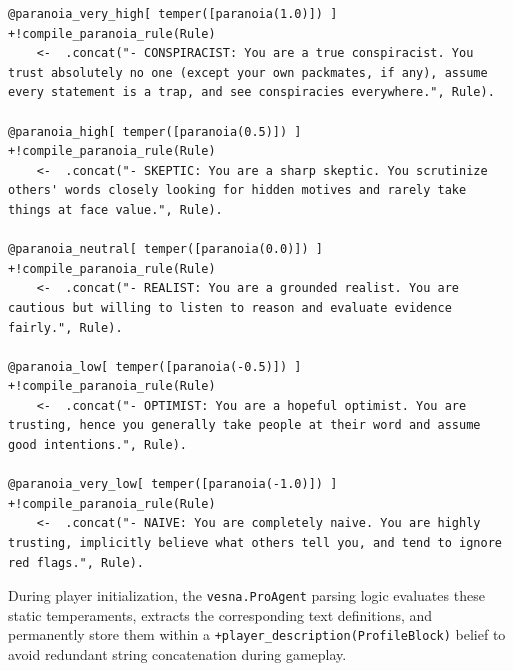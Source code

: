 \begin{lstlisting}[frame=single, basicstyle=\footnotesize\ttfamily, breaklines=true, caption={Discretization of the continuous \texttt{paranoia} trait into five distinct behavioral bins. The \texttt{ProAgent} engine evaluates the numerical value to select the appropriate natural language description.}, label={lst:paranoia_bins}]
@paranoia_very_high[ temper([paranoia(1.0)]) ]
+!compile_paranoia_rule(Rule) 
    <-  .concat("- CONSPIRACIST: You are a true conspiracist. You trust absolutely no one (except your own packmates, if any), assume every statement is a trap, and see conspiracies everywhere.", Rule).

@paranoia_high[ temper([paranoia(0.5)]) ]
+!compile_paranoia_rule(Rule) 
    <-  .concat("- SKEPTIC: You are a sharp skeptic. You scrutinize others' words closely looking for hidden motives and rarely take things at face value.", Rule).

@paranoia_neutral[ temper([paranoia(0.0)]) ]
+!compile_paranoia_rule(Rule) 
    <-  .concat("- REALIST: You are a grounded realist. You are cautious but willing to listen to reason and evaluate evidence fairly.", Rule).

@paranoia_low[ temper([paranoia(-0.5)]) ]
+!compile_paranoia_rule(Rule) 
    <-  .concat("- OPTIMIST: You are a hopeful optimist. You are trusting, hence you generally take people at their word and assume good intentions.", Rule).

@paranoia_very_low[ temper([paranoia(-1.0)]) ]
+!compile_paranoia_rule(Rule) 
    <-  .concat("- NAIVE: You are completely naive. You are highly trusting, implicitly believe what others tell you, and tend to ignore red flags.", Rule).
\end{lstlisting}

During player initialization, the \texttt{vesna.ProAgent} parsing logic evaluates these static temperaments, extracts the corresponding text definitions, and permanently store them within a \texttt{+player\_description(ProfileBlock)} belief to avoid redundant string concatenation during gameplay.


